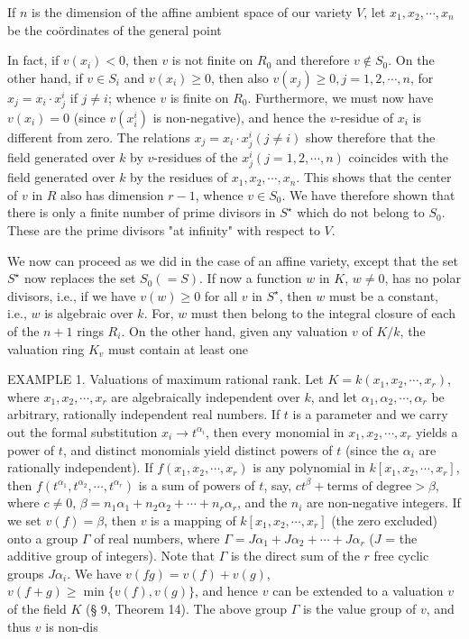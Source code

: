 If $n$ is the dimension of the affine ambient space of our variety $V$, let $x_1, x_2, \cdots, x_n$ be the coördinates of the general point

In fact, if $v(x_i) < 0$, then $v$ is not finite on $R_0$ and therefore $v \notin S_0$. On the other hand, if $v \in S_i$ and $v(x_i) \geq 0$, then also $v(x_j) \geq 0, j=1, 2, \cdots, n$, for $x_j = x_i \cdot x_j^i$ if $j \neq i$; whence $v$ is finite on $R_0$. Furthermore, we must now have $v(x_i) = 0$ (since $v(x_i^i)$ is non-negative), and hence the $v$-residue of $x_i$ is different from zero. The relations $x_j = x_i \cdot x_j^i (j \neq i)$ show therefore that the field generated over $k$ by $v$-residues of the $x_j^i (j=1, 2, \cdots, n)$ coincides with the field generated over $k$ by the residues of $x_1, x_2, \cdots, x_n$. This shows that the center of $v$ in $R$ also has dimension $r-1$, whence $v \in S_0$. We have therefore shown that there is only a finite number of prime divisors in $S^\star$ which do not belong to $S_0$. These are the prime divisors "at infinity" with respect to $V$.

We now can proceed as we did in the case of an affine variety, except that the set $S^\star$ now replaces the set $S_0(=S)$. If now a function $w$ in $K$, $w \neq 0$, has no polar divisors, i.e., if we have $v(w) \geq 0$ for all $v$ in $S^\star$, then $w$ must be a constant, i.e., $w$ is algebraic over $k$. For, $w$ must then belong to the integral closure of each of the $n+1$ rings $R_i$. On the other hand, given any valuation $v$ of $K/k$, the valuation ring $K_v$ must contain at least one

EXAMPLE 1. Valuations of maximum rational rank. Let $K = k(x_1, x_2, \cdots, x_r)$, where $x_1, x_2, \cdots, x_r$ are algebraically independent over $k$, and let $\alpha_1, \alpha_2, \cdots, \alpha_r$ be arbitrary, rationally independent real numbers. If $t$ is a parameter and we carry out the formal substitution $x_i \rightarrow t^{\alpha_i}$, then every monomial in $x_1, x_2, \cdots, x_r$ yields a power of $t$, and distinct monomials yield distinct powers of $t$ (since the $\alpha_i$ are rationally independent). If $f(x_1, x_2, \cdots, x_r)$ is any polynomial in $k[x_1, x_2, \cdots, x_r]$, then $f(t^{\alpha_1}, t^{\alpha_2}, \cdots, t^{\alpha_r})$ is a sum of powers of $t$, say, $ct^\beta + \text{terms of degree} > \beta$, where $c \neq 0$, $\beta = n_1\alpha_1 + n_2\alpha_2 + \cdots + n_r\alpha_r$, and the $n_i$ are non-negative integers. If we set $v(f) = \beta$, then $v$ is a mapping of $k[x_1, x_2, \cdots, x_r]$ (the zero excluded) onto a group $\Gamma$ of real numbers, where $\Gamma = J\alpha_1 + J\alpha_2 + \cdots + J\alpha_r$ ($J$ = the additive group of integers). Note that $\Gamma$ is the direct sum of the $r$ free cyclic groups $J\alpha_i$. We have $v(fg) = v(f) + v(g)$, $v(f+g) \geq \min\{v(f), v(g)\}$, and hence $v$ can be extended to a valuation $v$ of the field $K$ (§ 9, Theorem 14). The above group $\Gamma$ is the value group of $v$, and thus $v$ is non-dis

